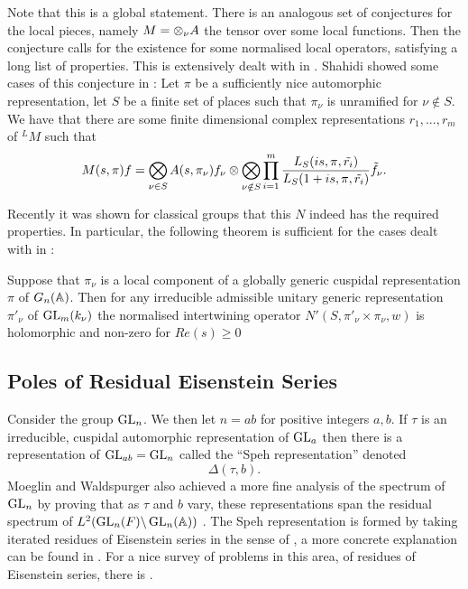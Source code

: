 Note that this is a global statement. There is an analogous set of conjectures for the local pieces, namely \(M = \otimes_\nu A\) the tensor over some local functions. Then the conjecture calls for the existence for some normalised local operators, satisfying a long list of properties. This is extensively dealt with in \cite{shahidiProofLanglandsConjecture1990}. Shahidi showed some cases of this conjecture in \cite{shahidiRamanujanConjectureFiniteness1988a}: Let \(\pi\) be a sufficiently nice automorphic representation, let \(S\) be a finite set of places such that \(\pi_\nu\) is unramified for \(\nu\notin S\). We have that there are some finite dimensional complex representations \(r_1, ..., r_m\) of \(^LM\) such that 
\[M(s, \pi)f = \bigotimes_{\nu\in S}A(s, \pi_\nu)f_\nu \otimes \bigotimes_{\nu\notin S} \prod_{i=1}^{m}\frac{L_S(is, \pi, \tilde{r_i})}{L_S(1+is, \pi, \tilde{r_i})} \tilde{f}_\nu.\]

Recently it was shown for classical groups that this \(N\) indeed has the required properties. In particular, the following theorem is sufficient for the cases dealt with in \cite{jiangPolesCertainResidual2013}:
\begin{Theorem}
	Suppose that \(\pi_\nu\) is a local component of a globally generic cuspidal representation \(\pi\) of \(G_n(\A)\). Then for any irreducible admissible unitary generic representation \(\pi'_\nu\) of \(\operatorname{GL}_m(k_\nu)\) the normalised intertwining operator \(N'(S, \pi'_\nu\times \pi_\nu, w)\) is holomorphic and non-zero for \(Re(s)\geq 0\)
\end{Theorem}

\subsection{Poles of Residual Eisenstein Series}
Consider the group \(\operatorname{GL}_n\). We then let \(n = ab\) for positive integers \(a,b\). If \(\tau\) is an irreducible, cuspidal automorphic representation of \(\operatorname{GL}_a\) then there is a representation of \(\operatorname{GL}_{ab} = \operatorname{GL}_n\) called the ``Speh representation'' denoted 
\[\Delta(\tau, b).\]
Moeglin and Waldspurger also achieved a more fine analysis of the spectrum of \(\operatorname{GL}_n\) by proving that as \(\tau\) and \(b\) vary, these representations span the residual spectrum of \(L^2(\GL_n(F) \backslash \GL_n(\A))\) \cite[Thm. 1.1]{jiangPolesCertainResidual2013}. The Speh representation is formed by taking iterated residues of Eisenstein series in the sense of \cite[V]{moeglinSpectralDecompositionEisenstein1995}, a more concrete explanation can be found in \cite[2.4]{brennerNotesAnalyticProperties2009}. For a nice survey of problems in this area, of residues of Eisenstein series, there is \cite{jiangResiduesEisensteinSeries2008a}.

